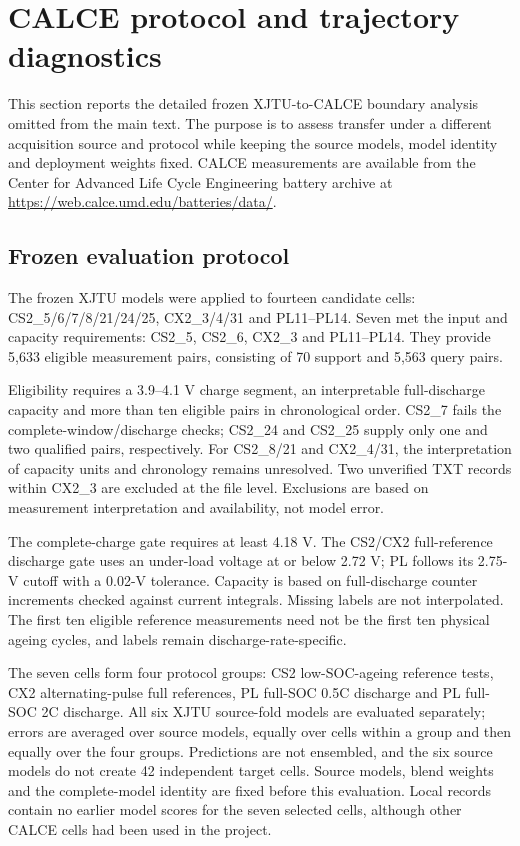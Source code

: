 \documentclass[11pt,a4paper]{article}
\begin{document}
\section{CALCE protocol and trajectory diagnostics}
\label{sec:scalce}
This section reports the detailed frozen XJTU-to-CALCE boundary analysis omitted from the main text. The purpose is to assess transfer under a different acquisition source and protocol while keeping the source models, model identity and deployment weights fixed. CALCE measurements are available from the Center for Advanced Life Cycle Engineering battery archive at \url{https://web.calce.umd.edu/batteries/data/}.
\subsection{Frozen evaluation protocol}
The frozen XJTU models were applied to fourteen candidate cells: CS2\_5/6/7/8/21/24/25, CX2\_3/4/31 and PL11--PL14. Seven met the input and capacity requirements: CS2\_5, CS2\_6, CX2\_3 and PL11--PL14. They provide 5,633 eligible measurement pairs, consisting of 70 support and 5,563 query pairs.

Eligibility requires a 3.9--4.1 V charge segment, an interpretable full-discharge capacity and more than ten eligible pairs in chronological order. CS2\_7 fails the complete-window/discharge checks; CS2\_24 and CS2\_25 supply only one and two qualified pairs, respectively. For CS2\_8/21 and CX2\_4/31, the interpretation of capacity units and chronology remains unresolved. Two unverified TXT records within CX2\_3 are excluded at the file level. Exclusions are based on measurement interpretation and availability, not model error.

The complete-charge gate requires at least 4.18 V. The CS2/CX2 full-reference discharge gate uses an under-load voltage at or below 2.72 V; PL follows its 2.75-V cutoff with a 0.02-V tolerance. Capacity is based on full-discharge counter increments checked against current integrals. Missing labels are not interpolated. The first ten eligible reference measurements need not be the first ten physical ageing cycles, and labels remain discharge-rate-specific.

The seven cells form four protocol groups: CS2 low-SOC-ageing reference tests, CX2 alternating-pulse full references, PL full-SOC 0.5C discharge and PL full-SOC 2C discharge. All six XJTU source-fold models are evaluated separately; errors are averaged over source models, equally over cells within a group and then equally over the four groups. Predictions are not ensembled, and the six source models do not create 42 independent target cells. Source models, blend weights and the complete-model identity are fixed before this evaluation. Local records contain no earlier model scores for the seven selected cells, although other CALCE cells had been used in the project.
\end{document}
